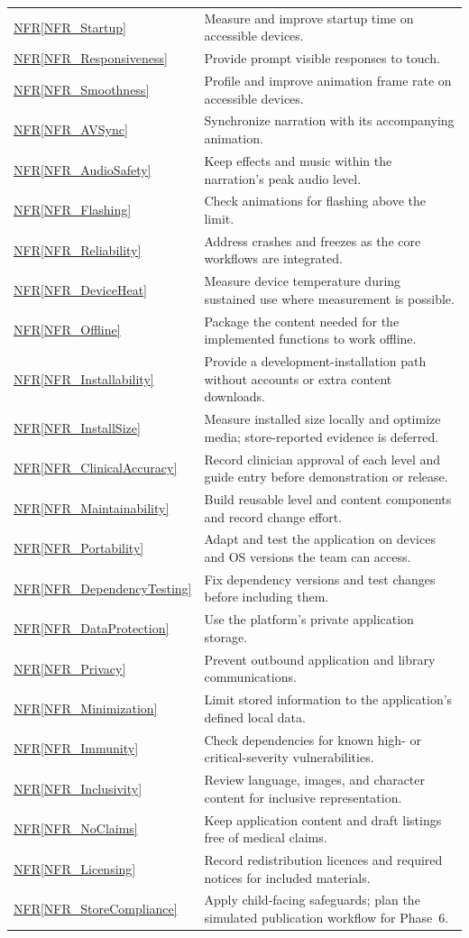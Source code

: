 \documentclass[10pt]{article}
\newcommand{\nfrref}[1]{\hyperref[#1]{NFR\ref*{#1}}}
\begin{document}
\begin{longtable}{@{}>{\raggedright\arraybackslash}p{}
>{\raggedright\arraybackslash}p{}@{}}
\nfrref{NFR_Startup} & Measure and improve startup time on accessible devices. \\
\nfrref{NFR_Responsiveness} & Provide prompt visible responses to touch. \\
\nfrref{NFR_Smoothness} & Profile and improve animation frame rate on accessible devices. \\
\nfrref{NFR_AVSync} & Synchronize narration with its accompanying animation. \\
\nfrref{NFR_AudioSafety} & Keep effects and music within the narration's peak audio level. \\
\nfrref{NFR_Flashing} & Check animations for flashing above the limit. \\
\nfrref{NFR_Reliability} & Address crashes and freezes as the core workflows are integrated. \\
\nfrref{NFR_DeviceHeat} & Measure device temperature during sustained use where measurement is possible. \\
\nfrref{NFR_Offline} & Package the content needed for the implemented functions to work offline. \\
\nfrref{NFR_Installability} & Provide a development-installation path without accounts or extra content downloads. \\
\nfrref{NFR_InstallSize} & Measure installed size locally and optimize media; store-reported evidence is deferred. \\
\nfrref{NFR_ClinicalAccuracy} & Record clinician approval of each level and guide entry before demonstration or release. \\
\nfrref{NFR_Maintainability} & Build reusable level and content components and record change effort. \\
\nfrref{NFR_Portability} & Adapt and test the application on devices and OS versions the team can access. \\
\nfrref{NFR_DependencyTesting} & Fix dependency versions and test changes before including them. \\
\nfrref{NFR_DataProtection} & Use the platform's private application storage. \\
\nfrref{NFR_Privacy} & Prevent outbound application and library communications. \\
\nfrref{NFR_Minimization} & Limit stored information to the application's defined local data. \\
\nfrref{NFR_Immunity} & Check dependencies for known high- or critical-severity vulnerabilities. \\
\nfrref{NFR_Inclusivity} & Review language, images, and character content for inclusive representation. \\
\nfrref{NFR_NoClaims} & Keep application content and draft listings free of medical claims. \\
\nfrref{NFR_Licensing} & Record redistribution licences and required notices for included materials. \\
\nfrref{NFR_StoreCompliance} & Apply child-facing safeguards; plan the simulated publication workflow for Phase~6. \\
\end{longtable}
\end{document}
